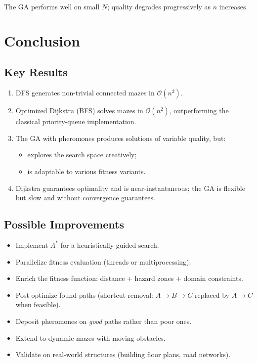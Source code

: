 \documentclass[12pt, a4paper]{article}
\theoremstyle{definition}
\newcommand{\bigO}[1]{\mathcal{O}\!\left(#1\right)}
\begin{document}
The GA performs well on small $N$; quality degrades progressively as $n$ increases.

\section{Conclusion}

\subsection{Key Results}

\begin{enumerate}
    \item DFS generates non-trivial connected mazes in $\bigO{n^2}$.
    \item Optimized Dijkstra (BFS) solves mazes in $\bigO{n^2}$, outperforming the
          classical priority-queue implementation.
    \item The GA with pheromones produces solutions of variable quality, but:
          \begin{itemize}[noitemsep]
              \item explores the search space creatively;
              \item is adaptable to various fitness variants.
          \end{itemize}
    \item Dijkstra guarantees optimality and is near-instantaneous;
          the GA is flexible but slow and without convergence guarantees.
\end{enumerate}

\subsection{Possible Improvements}

\begin{itemize}
    \item Implement $A^*$ for a heuristically guided search.
    \item Parallelize fitness evaluation (threads or multiprocessing).
    \item Enrich the fitness function: distance + hazard zones + domain constraints.
    \item Post-optimize found paths (shortcut removal: $A \to B \to C$ replaced by
          $A \to C$ when feasible).
    \item Deposit pheromones on \emph{good} paths rather than poor ones.
    \item Extend to dynamic mazes with moving obstacles.
    \item Validate on real-world structures (building floor plans, road networks).
\end{itemize}
\end{document}
